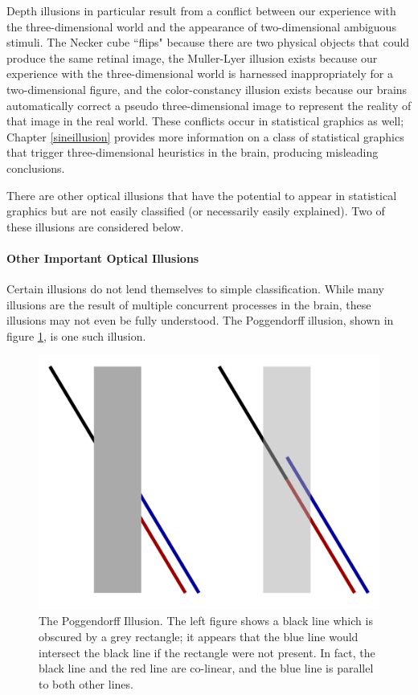 \documentclass[11pt]{isuthesis}\usepackage[]{graphicx}\usepackage[]{color}
\begin{document}
Depth illusions in particular result from a conflict between our experience with the three-dimensional world and the appearance of two-dimensional ambiguous stimuli. The Necker cube ``flips" because there are two physical objects that could produce the same retinal image, the Muller-Lyer illusion exists because our experience with the three-dimensional world is harnessed inappropriately for a two-dimensional figure, and the color-constancy illusion exists because our brains automatically correct a pseudo three-dimensional image to represent the reality of that image in the real world. These conflicts occur in statistical graphics as well; Chapter \ref{sineillusion} provides more information on a class of statistical graphics that trigger three-dimensional heuristics in the brain, producing misleading conclusions.

There are other optical illusions that have the potential to appear in statistical graphics but are not easily classified (or necessarily easily explained). Two of these illusions are considered below.
\paragraph{Other Important Optical Illusions}
Certain illusions do not lend themselves to simple classification. While many illusions are the result of multiple concurrent processes in the brain, these illusions may not even be fully understood. The Poggendorff illusion, shown in figure \ref{fig:poggendorff}, is one such illusion. 

\begin{figure}[htbp]\centering
\includegraphics[width=.4\linewidth]{Poggendorff}
\caption[The Poggendorff Illusion]{The Poggendorff Illusion. The left figure shows a black line which is obscured by a grey rectangle; it appears that the blue line would intersect the black line if the rectangle were not present. In fact, the black line and the red line are co-linear, and the blue line is parallel to both other lines.}\label{fig:poggendorff}
\end{figure}
\end{document}
